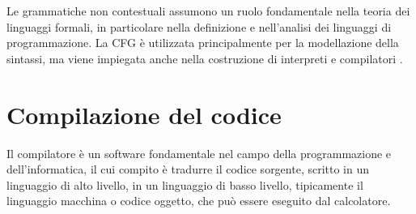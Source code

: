 \documentclass[12pt,a4paper,openright,twoside]{book}
\begin{document}
Le grammatiche non contestuali assumono un ruolo fondamentale nella teoria dei linguaggi formali, in particolare nella definizione e nell’analisi 
dei linguaggi di programmazione. La \ac{CFG} è utilizzata principalmente per la modellazione della sintassi, ma viene impiegata anche nella 
costruzione di interpreti e compilatori \cite{Linz2022}.

\section{Compilazione del codice}
Il compilatore è un software fondamentale nel campo della programmazione e dell’informatica, il cui compito è tradurre il codice sorgente, 
scritto in un linguaggio di alto livello, in un linguaggio di basso livello, tipicamente il linguaggio macchina o codice oggetto, che può 
essere eseguito 
dal calcolatore.
\end{document}
